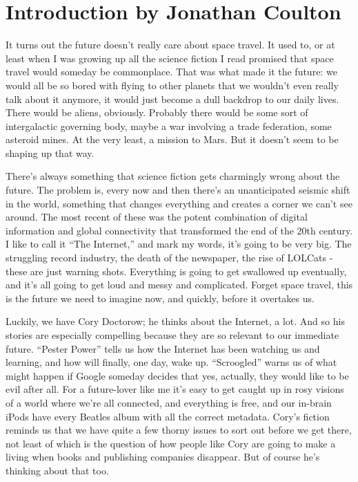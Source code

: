 \section{Introduction by Jonathan Coulton}

It turns out the future doesn't really care about space travel. It used 
to, or at least when I was growing up all the science fiction I read 
promised that space travel would someday be commonplace. That was what 
made it the future: we would all be so bored with flying to other 
planets that we wouldn't even really talk about it anymore, it would 
just become a dull backdrop to our daily lives. There would be aliens, 
obviously. Probably there would be some sort of intergalactic governing 
body, maybe a war involving a trade federation, some asteroid mines. At 
the very least, a mission to Mars. But it doesn't seem to be shaping up 
that way.

There's always something that science fiction gets charmingly wrong 
about the future. The problem is, every now and then there's an 
unanticipated seismic shift in the world, something that changes 
everything and creates a corner we can't see around. The most recent of 
these was the potent combination of digital information and global 
connectivity that transformed the end of the 20th century. I like to 
call it “The Internet,” and mark my words, it's going to be very 
big. The struggling record industry, the death of the newspaper, the 
rise of LOLCats - these are just warning shots. Everything is going to 
get swallowed up eventually, and it's all going to get loud and messy 
and complicated. Forget space travel, this is the future we need to 
imagine now, and quickly, before it overtakes us.

Luckily, we have Cory Doctorow; he thinks about the Internet, a lot. 
And so his stories are especially compelling because they are so 
relevant to our immediate future. “Pester Power” tells us how the 
Internet has been watching us and learning, and how will finally, one 
day, wake up. “Scroogled” warns us of what might happen if Google 
someday decides that yes, actually, they would like to be evil after 
all. For a future-lover like me it's easy to get caught up in rosy 
visions of a world where we're all connected, and everything is free, 
and our in-brain iPods have every Beatles album with all the correct 
metadata. Cory's fiction reminds us that we have quite a few thorny 
issues to sort out before we get there, not least of which is the 
question of how people like Cory are going to make a living when books 
and publishing companies disappear. But of course he's thinking about 
that too.

